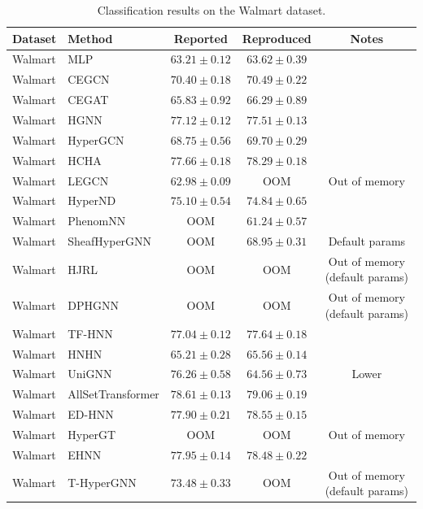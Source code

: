 \vspace{3em}

\begin{table}[H]
    \centering \small
    \renewcommand{\arraystretch}{1.12} 
    \begin{tabular}{llccc}
        \toprule
        Dataset & Method & Reported & Reproduced & Notes \\
        \midrule
        Walmart & MLP & \(63.21 \pm 0.12\) & \(63.62 \pm 0.39\) & \\
        Walmart & CEGCN & \(70.40 \pm 0.18\) & \(70.49 \pm 0.22\) & \\
        Walmart & CEGAT & \(65.83 \pm 0.92\) & \(66.29 \pm 0.89\) & \\
        \grprule
        Walmart & HGNN & \(77.12 \pm 0.12\) & \(77.51 \pm 0.13\) & \\
        Walmart & HyperGCN & \(68.75 \pm 0.56\) & \(69.70 \pm 0.29\) & \\
        Walmart & HCHA & \(77.66 \pm 0.18\) & \(78.29 \pm 0.18\) & \\
        Walmart & LEGCN & \(62.98 \pm 0.09\) & OOM & Out of memory \\
        Walmart & HyperND & \(75.10 \pm 0.54\) & \(74.84 \pm 0.65\) & \\
        Walmart & PhenomNN & OOM & \(61.24 \pm 0.57\) & \\
        Walmart & SheafHyperGNN & OOM & \(68.95 \pm 0.31\) & Default params \\
        Walmart & HJRL & OOM & OOM & Out of memory (default params) \\
        Walmart & DPHGNN & OOM & OOM & Out of memory (default params) \\
        Walmart & TF-HNN & \(77.04 \pm 0.12\) & \(77.64 \pm 0.18\) & \\
        \grprule
        Walmart & HNHN & \(65.21 \pm 0.28\) & \(65.56 \pm 0.14\) & \\
        Walmart & UniGNN & \(76.26 \pm 0.58\) & \(64.56 \pm 0.73\) & Lower \\
        Walmart & AllSetTransformer & \(78.61 \pm 0.13\) & \(79.06 \pm 0.19\) & \\
        Walmart & ED-HNN & \(77.90 \pm 0.21\) & \(78.55 \pm 0.15\) & \\
        Walmart & HyperGT & OOM & OOM & Out of memory \\
        \grprule
        Walmart & EHNN & \(77.95 \pm 0.14\) & \(78.48 \pm 0.22\) & \\
        Walmart & T-HyperGNN & \(73.48 \pm 0.33\) & OOM & Out of memory (default params) \\
        \bottomrule
    \end{tabular}
    \caption{Classification results on the Walmart dataset.}
\end{table}

